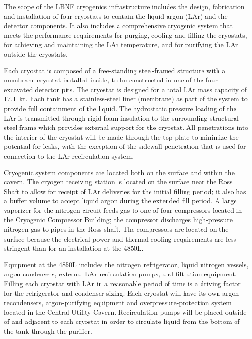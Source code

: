 The scope of the LBNF cryogenics infrastructure includes the design, fabrication and installation of four cryostats to contain the liquid argon (LAr) and the detector components. It also includes a comprehensive cryogenic system that meets the performance requirements for purging, cooling and filling the cryostats, for achieving and maintaining the LAr temperature, and for purifying the LAr outside the cryostats. 
 
Each cryostat is composed of a free-standing steel-framed structure with a membrane cryostat %
installed inside, to be constructed in one of the four excavated detector pits. The cryostat is designed for a total LAr mass capacity of 
17.1~kt. Each tank has a stainless-steel liner (membrane) as part of the %
system to provide full containment of the liquid. The hydrostatic pressure loading of the LAr is transmitted through rigid foam insulation to the surrounding structural steel frame which provides external support for the cryostat. All penetrations into the interior of the cryostat will be made through the top plate to minimize the potential for leaks, with the exception of the sidewall penetration that is used for connection to the LAr recirculation system.
 
Cryogenic system components are located both on the surface and within the cavern. The cryogen receiving station is located on the surface near the Ross Shaft to allow for receipt of LAr deliveries for the initial filling period; it also has a buffer volume to accept liquid argon during the extended fill period. A large vaporizer for the nitrogen circuit feeds gas to one of four compressors located in the Cryogenic Compressor Building; the compressor discharges high-pressure nitrogen gas to pipes in the Ross shaft. The compressors are located on the surface because the electrical power  and thermal cooling requirements are less stringent than for an installation at the 4850L.  
 
Equipment at the 4850L includes the nitrogen refrigerator, liquid nitrogen vessels, argon condensers, external LAr recirculation pumps, and filtration equipment. Filling each cryostat with LAr in a reasonable period of time is a driving factor for the refrigerator and condenser sizing.  Each cryostat will have its own argon recondensers, argon-purifying equipment and overpressure-protection system located in the Central Utility Cavern. Recirculation pumps will be placed outside of and adjacent to each cryostat in order to circulate liquid from the bottom of the tank through the purifier.
 
